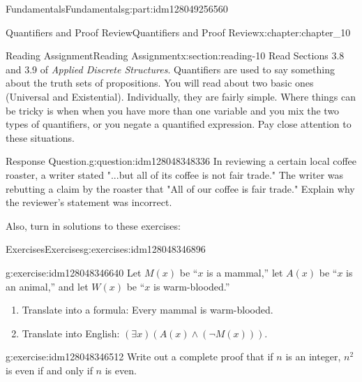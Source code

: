 \documentclass[oneside,10pt,]{book}
\numberwithin{equation}{section}
\begin{document}
\begin{partptx}{Fundamentals}{}{Fundamentals}{}{}{g:part:idm128049256560}
\begin{chapterptx}{Quantifiers and Proof Review}{}{Quantifiers and Proof Review}{}{}{x:chapter:chapter_10}
\begin{sectionptx}{Reading Assignment}{}{Reading Assignment}{}{}{x:section:reading-10}
Read Sections 3.8 and 3.9 of \emph{Applied Discrete Structures}.  Quantifiers are used to say something about the truth sets of propositions.  You will read about two basic ones (Universal and Existential).  Individually, they are fairly simple.  Where things can be tricky is when when you have more than one variable and you mix the two types of quantifiers, or you negate a quantified expression.  Pay close attention to these situations.%
\begin{question}{Response Question.}{g:question:idm128048348336}%
In reviewing a certain local coffee roaster, a writer stated  "...but all of its coffee is not fair trade." The writer was rebutting a claim by the roaster that "All of our coffee is fair trade."  Explain why the reviewer's statement was incorrect.%
\end{question}
Also, turn in solutions to these exercises:%
%
%
\typeout{************************************************}
\typeout{************************************************}
%
\begin{exercises-subsection}{Exercises}{}{Exercises}{}{}{g:exercises:idm128048346896}
\par\medskip\noindent%
%
\begin{exercisegroup}
\begin{divisionexerciseeg}{1}{}{}{g:exercise:idm128048346640}%
Let \(M(x)\) be ``\(x\) is a mammal,'' let \(A(x)\) be ``\(x\) is an animal,'' and let \(W(x)\) be ``\(x\) is warm-blooded.''%
\par
%
\begin{enumerate}[label=(\alph*)]
\item{}Translate into a formula: Every mammal is warm-blooded.%
\item{}Translate into English: \((\exists x)(A(x) \land  (\neg M(x)))\).%
\end{enumerate}
%
\end{divisionexerciseeg}%
\begin{divisionexerciseeg}{2}{}{}{g:exercise:idm128048346512}%
Write out a complete proof that if \(n\) is an integer, \(n^2\) is even if and only if \(n\) is even.%
\end{divisionexerciseeg}%
\end{exercisegroup}
\par\medskip\noindent
\end{exercises-subsection}
\end{sectionptx}
%
%
\typeout{************************************************}

\end{chapterptx}
\end{partptx}
\end{document}

